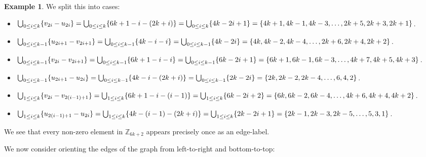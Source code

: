 \documentclass[12pt, a4paper]{article}
\theoremstyle{definition}
\newtheorem{example}[theorem]{Example}
\begin{document}
\begin{example}
We split this into cases:
\begin{itemize}
\item[(i)] $\bigcup_{0 \leq i \leq k}\{v_{2i}-u_{2i}\}=\bigcup_{0 \leq i \leq k}\{6k+1-i-(2k+i)\}=\bigcup_{0 \leq i \leq k}\{4k-2i+1\}\\
=\{4k+1,4k-1,4k-3,\ldots, 2k+5,2k+3,2k+1\}$.
\item[(ii)] $\bigcup_{0 \leq i \leq k-1}\{u_{2i+1}-v_{2i+1}\}=\bigcup_{0 \leq i \leq k-1}\{4k-i-i\}=\bigcup_{0 \leq i \leq k-1}\{4k-2i\}\\=\{4k,4k-2,4k-4,\ldots, 2k+6,2k+4,2k+2\}$.
\item[(iii)] $\bigcup_{0 \leq i \leq k-1}\{v_{2i}-v_{2i+1}\}=\bigcup_{0 \leq i \leq k-1}\{6k+1-i-i\}=\bigcup_{0 \leq i \leq k-1}\{6k-2i+1\}\\
=\{6k+1,6k-1,6k-3,\ldots, 4k+7,4k+5,4k+3\}$.
\item[(iv)] $\bigcup_{0 \leq i \leq k-1}\{u_{2i+1}-u_{2i}\}=\bigcup_{0 \leq i \leq k-1}\{4k-i-(2k+i)\}=\bigcup_{0 \leq i \leq k-1}\{2k-2i\}\\
=\{2k,2k-2,2k-4,\ldots, 6,4,2\}$.
\item[(v)]$\bigcup_{1 \leq i \leq k}\{v_{2i}-v_{2(i-1)+1}\}=\bigcup_{1 \leq i \leq k}\{6k+1-i-(i-1)\}=\bigcup_{1 \leq i \leq k}\{6k-2i+2\}\\
=\{6k,6k-2,6k-4,\ldots, 4k+6,4k+4,4k+2\}$.
\item[(vi)] $\bigcup_{1 \leq i \leq k}\{u_{2(i-1)+1}-u_{2i}\}=\bigcup_{1 \leq i \leq k}\{4k-(i-1)-(2k+i)\}=\bigcup_{1 \leq i \leq k}\{2k-2i+1\}\\
=\{2k-1,2k-3,2k-5,\ldots, 5,3,1\}$.
\end{itemize} 
We see that every non-zero element in $\mathbb{Z}_{6k+2}$ appears precisely once as an edge-label.
    
We now consider orienting the edges of the graph from left-to-right and bottom-to-top:
    \begin{center}
\end{center}
\end{example}
\end{document}
